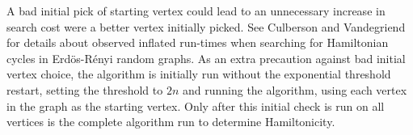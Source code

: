 \documentclass[twoside,11pt]{article}
\begin{document}
%
%

%

A bad initial pick of starting vertex could lead to an unnecessary increase in search cost
were a better vertex initially picked.  See Culberson and Vandegriend \citeyear{vandegriend} for
details about observed inflated run-times when searching for Hamiltonian cycles in Erd\"os-R\'enyi random graphs.
As an extra precaution
against bad initial vertex choice, the algorithm is initially run without the exponential
threshold restart, setting the threshold to $2n$ and running the algorithm, using each vertex in the graph as the starting
vertex.
Only after this initial check is run on all vertices is the
complete algorithm
run to determine Hamiltonicity.
\end{document}
